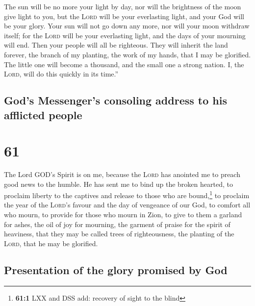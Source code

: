  The sun will be no more your light by day, nor will the
brightness of the moon give light to you, but the \textsc{Lord} will be
your everlasting light, and your God will be your glory. 
Your sun will not go down any more, nor will your moon withdraw itself;
for the \textsc{Lord} will be your everlasting light, and the days of
your mourning will end.  Then your people will all be
righteous. They will inherit the land forever, the branch of my
planting, the work of my hands, that I may be glorified. 
The little one will become a thousand, and the small one a strong
nation. I, the \textsc{Lord}, will do this quickly in its time.''

\hypertarget{gods-messengers-consoling-address-to-his-afflicted-people}{%
\subsection{God's Messenger's consoling address to his afflicted
people}\label{gods-messengers-consoling-address-to-his-afflicted-people}}

\hypertarget{section-60}{%
\section{61}\label{section-60}}

 The Lord GOD's Spirit is on me, because the \textsc{Lord}
has anointed me to preach good news to the humble. He has sent me to
bind up the broken hearted, to proclaim liberty to the captives and
release to those who are bound,\footnote{\textbf{61:1} LXX and DSS add:
  recovery of sight to the blind}  to proclaim the year of
the \textsc{Lord}'s favour and the day of vengeance of our God, to
comfort all who mourn,  to provide for those who mourn in
Zion, to give to them a garland for ashes, the oil of joy for mourning,
the garment of praise for the spirit of heaviness, that they may be
called trees of righteousness, the planting of the \textsc{Lord}, that
he may be glorified.

\hypertarget{presentation-of-the-glory-promised-by-god}{%
\subsection{Presentation of the glory promised by
God}\label{presentation-of-the-glory-promised-by-god}}

